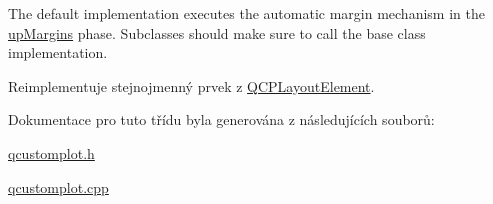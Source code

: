 The default implementation executes the automatic margin mechanism in the \hyperlink{classQCPLayoutElement_a0d83360e05735735aaf6d7983c56374da288cb59a92280e47261a341f2813e676}{up\+Margins} phase. Subclasses should make sure to call the base class implementation. 

Reimplementuje stejnojmenný prvek z \hyperlink{classQCPLayoutElement_a929c2ec62e0e0e1d8418eaa802e2af9b}{Q\+C\+P\+Layout\+Element}.



Dokumentace pro tuto třídu byla generována z následujících souborů\+:\begin{DoxyCompactItemize}
\item 
\hyperlink{qcustomplot_8h}{qcustomplot.\+h}\item 
\hyperlink{qcustomplot_8cpp}{qcustomplot.\+cpp}\end{DoxyCompactItemize}
